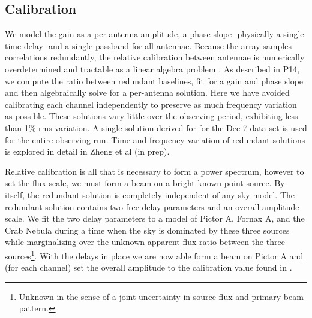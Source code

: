\documentclass[preprint]{aastex}
\begin{document}
\subsection{Calibration}
We model the gain as a per-antenna amplitude, a phase slope -physically a single time delay- and a single passband for all antennae.  Because the array samples correlations redundantly, the relative calibration between antennae is numerically overdetermined and tractable as a linear algebra problem \cite{Liu:2010p10391}.  As described in P14, we compute the ratio between redundant baselines, fit for a gain and phase slope and then algebraically solve for a per-antenna solution.  Here we have avoided calibrating each channel independently to preserve as much frequency variation as possible.   These solutions vary little over the observing period, exhibiting less than 1\% rms variation. A single solution derived for for the Dec 7 data set is used for the entire observing run. Time and frequency variation of redundant solutions is explored in detail in Zheng et al (in prep).  

Relative calibration is all that is necessary to form a power spectrum, however to set the flux scale, we must form a beam on a bright known point source.  By itself, the redundant solution is completely independent of any sky model. The redundant solution contains two free delay parameters and an overall amplitude scale. We fit the two delay parameters to a model of Pictor A, Fornax A, and the Crab Nebula during a time when the sky is dominated by these three sources while marginalizing over the unknown apparent flux ratio between the three sources\footnote{Unknown in the sense of a joint uncertainty in source flux and primary beam pattern.}. With the delays in place we are now able form a beam on Pictor A and (for each channel) set the overall amplitude to the calibration value found in \cite{jacobs:2013b}.
  
\end{document}
